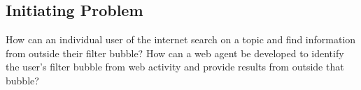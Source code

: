 \subsection*{Initiating Problem} How can an individual user of the internet
search on a topic and find information from outside their filter bubble? 
How can a web agent be developed to identify the user's filter bubble from web
activity and provide results from outside that bubble?
